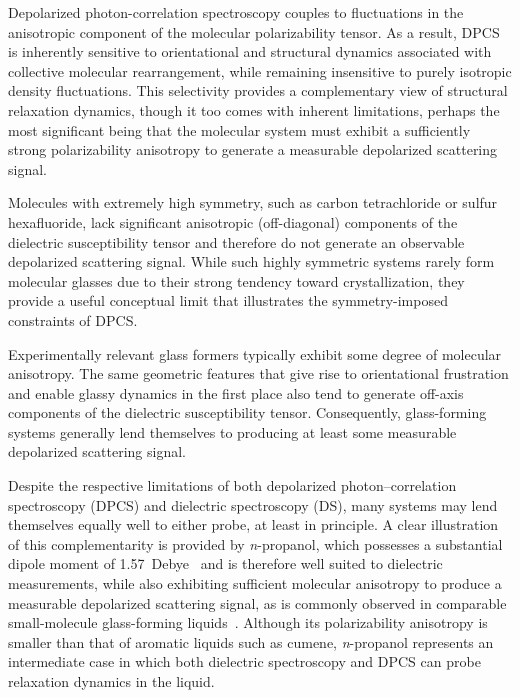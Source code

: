 Depolarized photon-correlation spectroscopy couples to fluctuations in the anisotropic component of the molecular polarizability tensor. As a result, DPCS is inherently sensitive to orientational and structural dynamics associated with collective molecular rearrangement, while remaining insensitive to purely isotropic density fluctuations. This selectivity provides a complementary view of structural relaxation dynamics, though it too comes with inherent limitations, perhaps the most significant being that the molecular system must exhibit a sufficiently strong polarizability anisotropy to generate a measurable depolarized scattering signal.

Molecules with extremely high symmetry, such as carbon tetrachloride or sulfur hexafluoride, lack significant anisotropic (off-diagonal) components of the dielectric susceptibility tensor and therefore do not generate an observable depolarized scattering signal. While such highly symmetric systems rarely form molecular glasses due to their strong tendency toward crystallization, they provide a useful conceptual limit that illustrates the symmetry-imposed constraints of DPCS. 

Experimentally relevant glass formers typically exhibit some degree of molecular anisotropy.  The same geometric features that give rise to orientational frustration and enable glassy dynamics in the first place also tend to generate off-axis components of the dielectric susceptibility tensor. Consequently, glass-forming systems generally lend themselves to producing at least some measurable depolarized scattering signal.

Despite the respective limitations of both depolarized photon--correlation spectroscopy (DPCS) and dielectric spectroscopy (DS), many systems may lend themselves equally well to either probe, at least in principle. A clear illustration of this complementarity is provided by \textit{n}-propanol, which possesses a substantial dipole moment of 1.57~Debye~\cite[p.~9-48]{CRC1997} and is therefore well suited to dielectric measurements, while also exhibiting sufficient molecular anisotropy to produce a measurable depolarized scattering signal, as is commonly observed in comparable small-molecule glass-forming liquids~\cite[p.~114]{Berne}\cite{Brodin}. Although its polarizability anisotropy is smaller than that of aromatic liquids such as cumene, \textit{n}-propanol represents an intermediate case in which both dielectric spectroscopy and DPCS can probe relaxation dynamics in the liquid.

